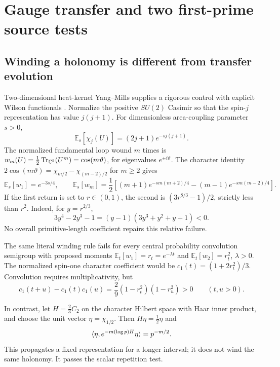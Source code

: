 \section{Gauge transfer and two first-prime source tests}\label{app:gauge}
\subsection{Winding a holonomy is different from transfer evolution}
Two-dimensional heat-kernel Yang--Mills supplies a rigorous control
with explicit Wilson functionals \cite{YM2}. Normalize the positive
$SU(2)$ Casimir so that the spin-$j$ representation has value $j(j+1)$.
For dimensionless area-coupling parameter $s>0$,
\begin{equation}\label{eq:heat-character}
 \mathbb E_s[\chi_j(U)]=(2j+1)e^{-sj(j+1)}.
\end{equation}
The normalized fundamental loop wound $m$ times is
$w_m(U)=\tfrac12\operatorname{Tr}_{\mathbb C^2}(U^m)=\cos(m\vartheta)$, for eigenvalues
$e^{\pm i\vartheta}$. The character identity
$2\cos(m\vartheta)=\chi_{m/2}-\chi_{(m-2)/2}$ for $m\geq2$ gives
\begin{equation}\label{eq:windings}
 \mathbb E_s[w_1]=e^{-3s/4},\qquad
 \mathbb E_s[w_m]=\frac12\left[(m+1)e^{-sm(m+2)/4}
                           -(m-1)e^{-sm(m-2)/4}\right].
\end{equation}
If the first return is set to $r\in(0,1)$, the second is
$(3r^{8/3}-1)/2$, strictly less than $r^2$. Indeed, for $y=r^{2/3}$,
\begin{equation}\label{eq:winding-failure}
 3y^4-2y^3-1=(y-1)(3y^3+y^2+y+1)<0.
\end{equation}
No overall primitive-length coefficient repairs this relative failure.

The same literal winding rule fails for every central probability
convolution semigroup with proposed moments
$\mathbb E_t[w_1]=r_t=e^{-\lambda t}$ and
$\mathbb E_t[w_2]=r_t^2$, $\lambda>0$. The normalized spin-one
character coefficient would be $c_1(t)=(1+2r_t^2)/3$. Convolution
requires multiplicativity, but
\begin{equation}\label{eq:semigroup-failure}
 c_1(t+u)-c_1(t)c_1(u)
 =\frac29(1-r_t^2)(1-r_u^2)>0\qquad(t,u>0).
\end{equation}

In contrast, let $H=\tfrac23C_2$ on the character Hilbert space with
Haar inner product, and choose the unit vector $\eta=\chi_{1/2}$.
Then $H\eta=\tfrac12\eta$ and
\begin{equation}\label{eq:transfer-return}
 \langle \eta,e^{-m(\log p)H}\eta\rangle=p^{-m/2}.
\end{equation}
This propagates a fixed representation for a longer interval; it does
not wind the same holonomy. It passes the scalar repetition test.

